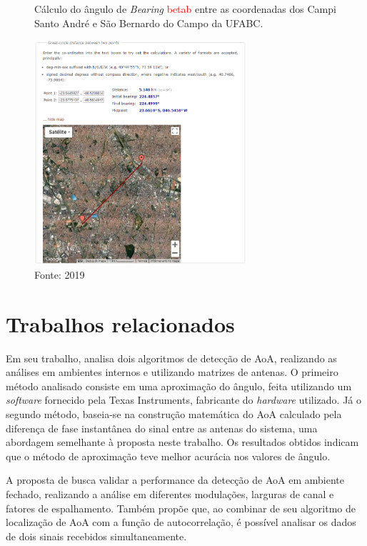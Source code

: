 \begin{figure}[htbp]
    \centering
    \caption{Cálculo do ângulo de \textit{Bearing} \textcolor{Red}{\ac{betab}} entre as coordenadas dos Campi Santo André e São Bernardo do Campo da UFABC.}
    \includegraphics[width=0.7\textwidth]{../pictures/bearing.png}
    \caption*{Fonte: \citeauthor{chrisveness} 2019 \cite{chrisveness}}
    \label{fig:bearing}
\end{figure}

% 

\pagebreak



\section{Trabalhos relacionados}

Em seu trabalho, \citeauthor{horst2021localization} \cite{horst2021localization} analisa dois algoritmos de detecção de \ac{AoA}, realizando as análises em ambientes internos e utilizando matrizes de antenas.
O primeiro método analisado consiste em uma aproximação do ângulo, feita utilizando um \textit{software} fornecido pela Texas Instruments, fabricante do \textit{hardware} utilizado.
Já o segundo método, baseia-se na construção matemática do \ac{AoA} calculado pela diferença de fase instantânea do sinal entre as antenas do sistema, uma abordagem semelhante à proposta neste trabalho.
Os resultados obtidos indicam que o método de aproximação teve melhor acurácia nos valores de ângulo.

A proposta de \citeauthor{zeaiter:hal-03693641} \cite{zeaiter:hal-03693641} busca validar a performance da detecção de \ac{AoA} em ambiente fechado, realizando a análise em diferentes modulações, larguras de canal e fatores de espalhamento.
Também propõe que, ao combinar de seu algoritmo de localização de \ac{AoA} com a função de autocorrelação, é possível analisar os dados de dois sinais recebidos simultaneamente.

